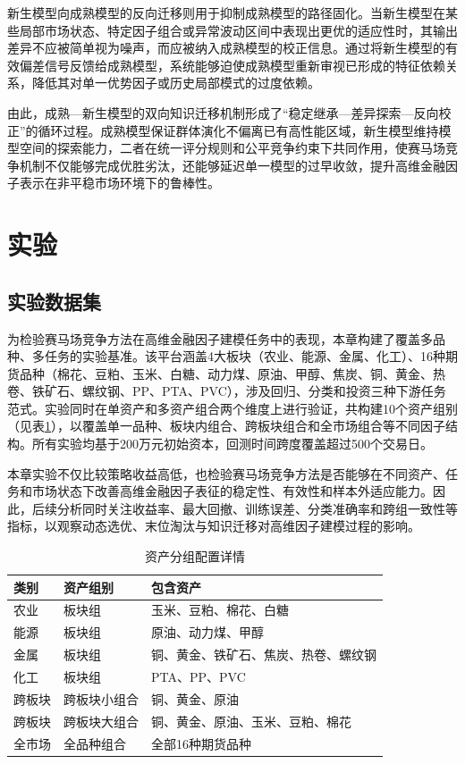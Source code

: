 新生模型向成熟模型的反向迁移则用于抑制成熟模型的路径固化。当新生模型在某些局部市场状态、特定因子组合或异常波动区间中表现出更优的适应性时，其输出差异不应被简单视为噪声，而应被纳入成熟模型的校正信息。通过将新生模型的有效偏差信号反馈给成熟模型，系统能够迫使成熟模型重新审视已形成的特征依赖关系，降低其对单一优势因子或历史局部模式的过度依赖。

由此，成熟—新生模型的双向知识迁移机制形成了“稳定继承—差异探索—反向校正”的循环过程。成熟模型保证群体演化不偏离已有高性能区域，新生模型维持模型空间的探索能力，二者在统一评分规则和公平竞争约束下共同作用，使赛马场竞争机制不仅能够完成优胜劣汰，还能够延迟单一模型的过早收敛，提升高维金融因子表示在非平稳市场环境下的鲁棒性。

\section{实验}

\subsection{实验数据集}
为检验赛马场竞争方法在高维金融因子建模任务中的表现，本章构建了覆盖多品种、多任务的实验基准。该平台涵盖4大板块（农业、能源、金属、化工）、16种期货品种（棉花、豆粕、玉米、白糖、动力煤、原油、甲醇、焦炭、铜、黄金、热卷、铁矿石、螺纹钢、PP、PTA、PVC），涉及回归、分类和投资三种下游任务范式。实验同时在单资产和多资产组合两个维度上进行验证，共构建10个资产组别（见表\ref{tab:highdimassetGrouping}），以覆盖单一品种、板块内组合、跨板块组合和全市场组合等不同因子结构。所有实验均基于200万元初始资本，回测时间跨度覆盖超过500个交易日。

本章实验不仅比较策略收益高低，也检验赛马场竞争方法是否能够在不同资产、任务和市场状态下改善高维金融因子表征的稳定性、有效性和样本外适应能力。因此，后续分析同时关注收益率、最大回撤、训练误差、分类准确率和跨组一致性等指标，以观察动态选优、末位淘汰与知识迁移对高维因子建模过程的影响。

\begin{table}[!htbp]
\centering
\caption{资产分组配置详情}
\label{tab:highdimassetGrouping}
\small
\setlength{\tabcolsep}{4pt}
\renewcommand{\arraystretch}{1.15}
\begin{tabular}{>{\raggedright\arraybackslash}p{2.4cm} >{\centering\arraybackslash}p{2.4cm} >{\raggedright\arraybackslash}p{7.8cm}}
\toprule
类别 & 资产组别 & 包含资产 \\
\midrule
农业 & 板块组 & 玉米、豆粕、棉花、白糖 \\
\addlinespace
能源 & 板块组 & 原油、动力煤、甲醇 \\
\addlinespace
金属 & 板块组 & 铜、黄金、铁矿石、焦炭、热卷、螺纹钢 \\
\addlinespace
化工 & 板块组 & PTA、PP、PVC \\
\addlinespace
跨板块 & 跨板块小组合 & 铜、黄金、原油 \\
\addlinespace
跨板块 & 跨板块大组合 & 铜、黄金、原油、玉米、豆粕、棉花 \\
\addlinespace
全市场 & 全品种组合 & 全部16种期货品种 \\
\bottomrule
\end{tabular}
\end{table}

